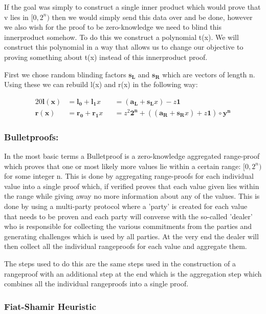 \documentclass{article}
\newcommand{\eq}[1]{\begin{alignat*}{20}#1\end{alignat*}}
\renewcommand{\vec}[1]{\boldsymbol{#1}}
\newcommand{\vecran}[1]{\mathbf{#1}}
\begin{document}
If the goal was simply to construct a single inner product which would prove that v lies in $[0,2^n)$ then we would simply send this data over and be done, however we also wish for the proof to be zero-knowledge we need to blind this innerproduct somehow. To do this we construct a polynomial t(x). We will construct this polynomial in a way that allows us to change our objective to proving something about t(x) instead of this innerproduct proof.

First we chose random blinding factors $\vecran{s_L}$ and $\vecran{s_R}$ which are vectors of length n. Using these we can rebuild l(x) and r(x) in the following way:

\eq{
	\vec{l(x)} &= \vec{l_0} + \vec{l_1}x &&= (\vec{a_L} + \vec{s_L}x) - z\vec{1}\\
	\vec{r(x)} &= \vec{r_0} + \vec{r_1}x &&= z^2\vec{2^n} + ((\vec{a_R} + \vec{s_R}x) + z\vec{1})\circ\vecran{y^n}
}

\subsubsection{Bulletproofs:}

In the most basic terms a Bulletproof is a zero-knowledge aggregated range-proof which proves that one or most likely more values lie within a certain range: $[0,2^n)$ for some integer n. This is done by aggregating range-proofs for each individual value into a single proof which, if verified proves that each value given lies within the range while giving away no more information about any of the values. This is done by using a multi-party protocol where a 'party' is created for each value that needs to be proven and each party will converse with the so-called 'dealer' who is responsible for collecting the various commitments from the parties and generating challenges which is used by all parties. At the very end the dealer will then collect all the individual rangeproofs for each value and aggregate them. 

The steps used to do this are the same steps used in the construction of a rangeproof with an additional step at the end which is the aggregation step which combines all the individual rangeproofs into a single proof.

\subsubsection{Fiat-Shamir Heuristic}\label{fiat-shamir-heuristic}
\end{document}
